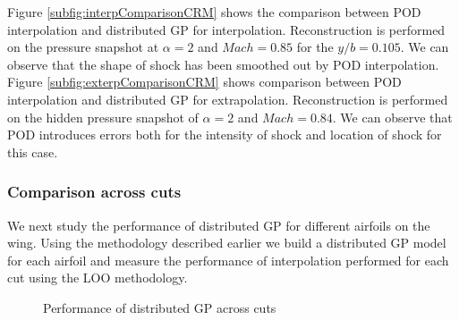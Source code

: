 Figure \ref{subfig:interpComparisonCRM} shows the comparison between POD interpolation and distributed GP for interpolation. Reconstruction is performed on the pressure snapshot at \(\alpha = 2\) and \(Mach = 0.85\) for the \(y/b = 0.105\). We can observe that the shape of shock has been smoothed out by POD interpolation. Figure \ref{subfig:exterpComparisonCRM} shows comparison between POD interpolation and distributed GP for extrapolation. Reconstruction is performed on the hidden pressure snapshot of \(\alpha = 2\) and \(Mach = 0.84\). We can observe that POD introduces errors both for the intensity of shock and location of shock for this case.  

\subsubsection{Comparison across cuts}
We next study the performance of distributed GP for different airfoils on the wing. Using the methodology described earlier we build a distributed GP model for each airfoil and measure the performance of interpolation performed for each cut using the LOO methodology. 

\begin{figure}[!ht]
  \centering
  \quad
  \caption{Performance of distributed GP across cuts}
\end{figure}

